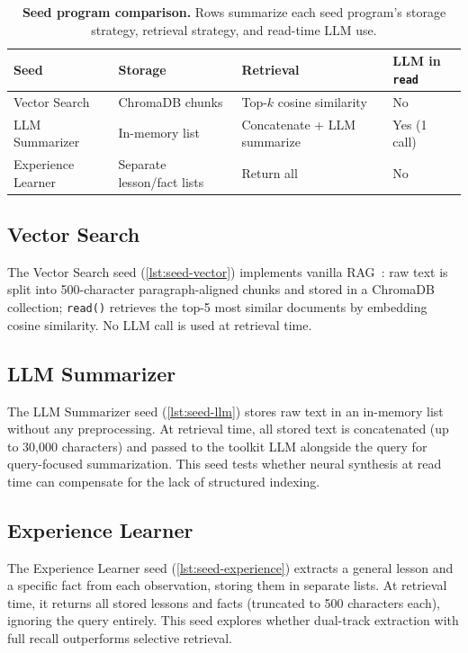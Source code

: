\begin{table}[!htbp]
\centering
\caption{\textbf{Seed program comparison.}
Rows summarize each seed program's storage strategy, retrieval strategy, and read-time LLM use.}
\label{tab:seed-comparison}
\small
\begin{tabular}{@{}llll@{}}
\toprule
\textbf{Seed} & \textbf{Storage} & \textbf{Retrieval} & \textbf{LLM in \texttt{read}} \\
\midrule
Vector Search & ChromaDB chunks & Top-$k$ cosine similarity & No \\
LLM Summarizer & In-memory list & Concatenate + LLM summarize & Yes (1 call) \\
Experience Learner & Separate lesson/fact lists & Return all & No \\
\bottomrule
\end{tabular}
\end{table}

\subsection{Vector Search}
\label{app:seed-vector-search}

The Vector Search seed (\autoref{lst:seed-vector}) implements vanilla RAG~\citep{rag}: raw text is split into 500-character paragraph-aligned chunks and stored in a ChromaDB collection; \texttt{read()} retrieves the top-5 most similar documents by embedding cosine similarity.
No LLM call is used at retrieval time.

\subsection{LLM Summarizer}
\label{app:seed-llm-summarizer}

The LLM Summarizer seed (\autoref{lst:seed-llm}) stores raw text in an in-memory list without any preprocessing.
At retrieval time, all stored text is concatenated (up to 30{,}000 characters) and passed to the toolkit LLM alongside the query for query-focused summarization.
This seed tests whether neural synthesis at read time can compensate for the lack of structured indexing.

\subsection{Experience Learner}
\label{app:seed-experience-learner}

The Experience Learner seed (\autoref{lst:seed-experience}) extracts a general lesson and a specific fact from each observation, storing them in separate lists.
At retrieval time, it returns all stored lessons and facts (truncated to 500 characters each), ignoring the query entirely.
This seed explores whether dual-track extraction with full recall outperforms selective retrieval.

